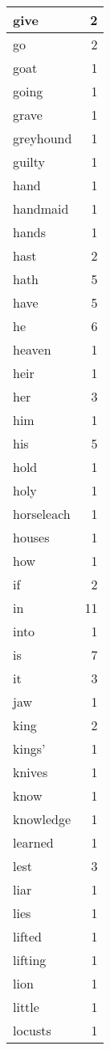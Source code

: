\begin{center}
\begin{longtable}{l|r}
give & 2\\ \hline 
go & 2\\ \hline 
goat & 1\\ \hline 
going & 1\\ \hline 
grave & 1\\ \hline 
greyhound & 1\\ \hline 
guilty & 1\\ \hline 
hand & 1\\ \hline 
handmaid & 1\\ \hline 
hands & 1\\ \hline 
hast & 2\\ \hline 
hath & 5\\ \hline 
have & 5\\ \hline 
he & 6\\ \hline 
heaven & 1\\ \hline 
heir & 1\\ \hline 
her & 3\\ \hline 
him & 1\\ \hline 
his & 5\\ \hline 
hold & 1\\ \hline 
holy & 1\\ \hline 
horseleach & 1\\ \hline 
houses & 1\\ \hline 
how & 1\\ \hline 
if & 2\\ \hline 
in & 11\\ \hline 
into & 1\\ \hline 
is & 7\\ \hline 
it & 3\\ \hline 
jaw & 1\\ \hline 
king & 2\\ \hline 
kings' & 1\\ \hline 
knives & 1\\ \hline 
know & 1\\ \hline 
knowledge & 1\\ \hline 
learned & 1\\ \hline 
lest & 3\\ \hline 
liar & 1\\ \hline 
lies & 1\\ \hline 
lifted & 1\\ \hline 
lifting & 1\\ \hline 
lion & 1\\ \hline 
little & 1\\ \hline 
locusts & 1\\ \hline 

\end{longtable}
\end{center}
